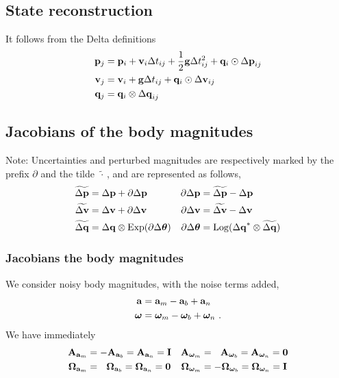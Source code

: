 \subsection{State reconstruction}

It follows from the Delta definitions
%
\begin{align}
\begin{split}
{\bf p}_j &= {\bf p}_i + {\bf v}_i\Delta t_{ij} + \frac12{\bf g}\Delta t_{ij}^2 + {\bf q}_i\odot{\Delta{\bf p}}_{ij} \\
{\bf v}_j &= {\bf v}_i + {\bf g}\Delta t_{ij} + {\bf q}_i\odot{\Delta{\bf v}}_{ij} \\
{\bf q}_j &= {\bf q}_i\otimes{\Delta{\bf q}}_{ij}   
\end{split}
\end{align}


\subsection{Jacobians of the body magnitudes}


Note: Uncertainties and perturbed magnitudes are respectively marked by the prefix $\partial$ and the tilde\, $\widetilde\cdot$\,, and are represented as follows,
%
\begin{align*}
\widetilde{{\Delta{\bf p}}} &= {\Delta{\bf p}} + \partial{\Delta{\bf p}} & \partial{\Delta{\bf p}} &= \widetilde{{\Delta{\bf p}}}-{\Delta{\bf p}} \\
\widetilde{{\Delta{\bf v}}} &= {\Delta{\bf v}} + \partial{\Delta{\bf v}} & \partial{\Delta{\bf v}} &= \widetilde{{\Delta{\bf v}}}-{\Delta{\bf v}} \\
\widetilde{{\Delta{\bf q}}} &= {\Delta{\bf q}} \otimes \operatorname*{Exp}( \partial{\Delta{{\bm \theta}}} ) & \partial{\Delta{{\bm \theta}}} &= \operatorname*{Log}({\Delta{\bf q}}^*\otimes\widetilde{{\Delta{\bf q}}}) 
\end{align*}



\subsubsection{Jacobians \wrt the body magnitudes}
We consider noisy body magnitudes, with the noise terms added,%
%
\begin{align*}
{\bf a} &= {\bf a}_m - {{\bf a}_b} + {\bf a}_n \\
{{\bm \omega}} &= {{\bm \omega}}_m - {{{\bm \omega}}_b} + {{\bm \omega}}_n 
~.
\end{align*}
%
We have immediately
%
\begin{align*}
{\bf A}_{{\bf a}_m} 
  &= -{\bf A}_{{\bf a}_b} = {\bf A}_{{\bf a}_n} = {\bf I} 
& {\bf A}_{{{\bm \omega}}_m} 
  &= ~~{\bf A}_{{{\bm \omega}}_b} = {\bf A}_{{{\bm \omega}}_n} = \bf0 \\
{\bm \Omega}_{{\bf a}_m} 
  &= ~~{\bm \Omega}_{{\bf a}_b} = {\bm \Omega}_{{\bf a}_n} = \bf0 
& {\bm \Omega}_{{{\bm \omega}}_m} 
  &= -{\bm \Omega}_{{{\bm \omega}}_b} = {\bm \Omega}_{{{\bm \omega}}_n} = {\bf I} 
\end{align*}


